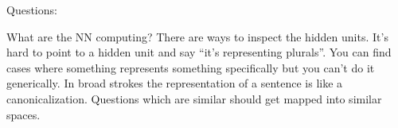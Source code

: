 Questions: 

What are the NN computing? There are ways to inspect the hidden units. It's hard to point to a hidden unit and say ``it's representing plurals''. You can find cases where something represents something specifically but you can't do it generically. In broad strokes the representation of a sentence is like a canonicalization. Questions which are similar should get mapped into similar spaces. 



